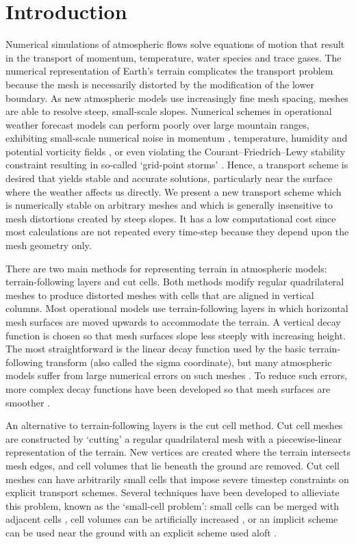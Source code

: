 \section{Introduction}

Numerical simulations of atmospheric flows solve equations of motion that result in the transport of momentum, temperature, water species and trace gases.  The numerical representation of Earth's terrain complicates the transport problem because the mesh is necessarily distorted by the modification of the lower boundary.
As new atmospheric models use increasingly fine mesh spacing, meshes are able to resolve steep, small-scale slopes.  Numerical schemes in operational weather forecast models can perform poorly over large mountain ranges, exhibiting small-scale numerical noise in momentum \citep{walko-avissar2008b}, temperature, humidity \citep{schaer2002} and potential vorticity fields \citep{hoinka-zaengl2004}, or even violating the Courant--Friedrich--Lewy stability constraint resulting in so-called `grid-point storms' \citep{webster2003}.
Hence, a transport scheme is desired that yields stable and accurate solutions, particularly near the surface where the weather affects us directly.
We present a new transport scheme which is numerically stable on arbitrary meshes and which is generally insensitive to mesh distortions created by steep slopes.  It has a low computational cost since most calculations are not repeated every time-step because they depend upon the mesh geometry only.

There are two main methods for representing terrain in atmospheric models: terrain-following layers and cut cells.  Both methods modify regular quadrilateral meshes to produce distorted meshes with cells that are aligned in vertical columns.  Most operational models use terrain-following layers in which horizontal mesh surfaces are moved upwards to accommodate the terrain.  A vertical decay function is chosen so that mesh surfaces slope less steeply with increasing height.
The most straightforward is the linear decay function used by the basic terrain-following transform \citep{galchen-somerville1975} (also called the sigma coordinate), but many atmospheric models suffer from large numerical errors on such meshes \citep{schaer2002,klemp2011,eckermann2014}.
To reduce such errors, more complex decay functions have been developed so that mesh surfaces are smoother \citep{simmons-burridge1981,schaer2002,leuenberger2010,klemp2011}.

An alternative to terrain-following layers is the cut cell method.  Cut cell meshes are constructed by `cutting' a regular quadrilateral mesh with a piecewise-linear representation of the terrain.  New vertices are created where the terrain intersects mesh edges, and cell volumes that lie beneath the ground are removed.  Cut cell meshes can have arbitrarily small cells that impose severe timestep constraints on explicit transport schemes.  Several techniques have been developed to allieviate this problem, known as the `small-cell problem': small cells can be merged with adjacent cells \citep{yamazaki2016}, cell volumes can be artificially increased \citep{steppeler2002}, or an implicit scheme can be used near the ground with an explicit scheme used aloft \citep{jebens2011}.

